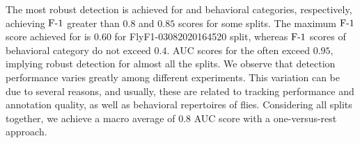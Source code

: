 The most robust detection is achieved for \ProboscisPumping and \PosturalAdjustment behavioral categories, respectively, achieving $\textnormal{F-}1$ greater than $0.8$ and $0.85$ scores for some splits.
The maximum $\textnormal{F-}1$ score achieved for \Grooming is $0.60$ for FlyF1-03082020164520 split, whereas $\textnormal{F-}1$ scores of \HaltereSwitch behavioral category do not exceed $0.4$.
AUC scores for the \ProboscisPumping often exceed $0.95$, implying robust detection for almost all the splits.
We observe that detection performance varies greatly among different experiments. This variation can be due to several reasons, and usually, these are related to tracking performance and annotation quality, as well as behavioral repertoires of flies.
Considering all splits together, we achieve a macro average of $0.8$ AUC score with a one-versus-rest approach.

